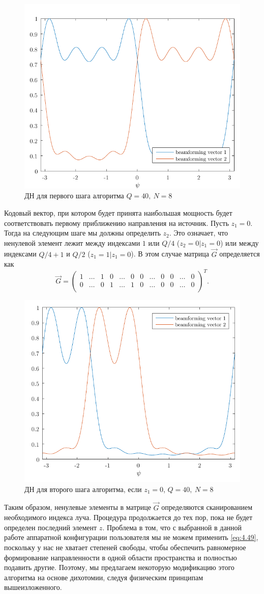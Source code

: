 \begin{figure}[ht]
    \centering
    \includegraphics[width=0.5\linewidth]{figs/fig4.18}
    \caption{ДН для первого шага алгоритма $Q=40,~N=8$}
    \label{fig:4.18}
\end{figure}
Кодовый вектор, при котором будет принята наибольшая мощность будет соответствовать
первому приближению направления на источник. Пусть $z_1 = 0$. Тогда на следующим шаге
мы должны определить $z_2$. Это означает, что ненулевой элемент лежит между индексами $1$ или $Q/4$ ($z_2 =0 | z_1 =0$) или
между индексами $Q/4 + 1$ и $Q/2$ ($z_1 = 1 | z_1 = 0$). В этом случае матрица $\vec G$ определяется как
\begin{equation}
    \label{eq:4.48}
    \vec G =
    \begin{pmatrix}
        1 & \dots & 1 & 0 & \dots & 0 & 0 & \dots & 0 & 0 & \dots & 0 \\
        0 & \dots & 0 & 1 & \dots & 1 & 0 & \dots & 0 & 0 & \dots & 0 \\
    \end{pmatrix}^T.
\end{equation}
\begin{figure}[ht]
    \centering
    \includegraphics[width=0.5\linewidth]{figs/fig4.19}
    \caption{ДН для второго шага алгоритма, если $z_1=0$, $Q=40,~N=8$}
    \label{fig:4.19}
\end{figure}

Таким образом, ненулевые элементы в матрице $\vec G$ определяются сканированием необходимого индекса луча.
Процедура продолжается до тех пор, пока не будет определен последний элемент $z$. Проблема в том, что
с выбранной в данной работе аппаратной конфигурации пользователя мы не можем
применить \eqref{eq:4.49}, поскольку у нас не хватает степеней свободы, чтобы
обеспечить равномерное формирование направленности в одной области пространства
и полностью подавить другие. Поэтому, мы предлагаем некоторую модификацию этого алгоритма на основе дихотомии, следуя физическим принципам вышеизложенного.

